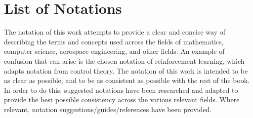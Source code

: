 \setlength{\glsdescwidth}{0.8\textwidth}

\chapter{List of Notations}

The notation of this work attempts to provide a clear and concise way of describing the terms and concepts used across the fields of mathematics, computer science, aerospace engineering, and other fields. An example of confusion that can arise is the chosen notation of reinforcement learning, which adapts notation from control theory. The notation of this work is intended to be as clear as possible, and to be as consistent as possible with the rest of the book. In order to do this, suggested notations have been researched and adapted to provide the best possible consistency across the various relevant fields. Where relevant, notation suggestions/guides/references have been provided.


\printnoidxglossary[
    type={notation:np},
    title={Numbers \& Arrays},
    nonumberlist
]

\printnoidxglossary[
    type={notation:ix},
    title={Indexing},
    nonumberlist
]

\printnoidxglossary[
    type={notation:orbit},
    title={Orbital Mechanics},
    nonumberlist
]
\printnoidxglossary[
    type={notation:mission},
    title={Other},
    nonumberlist
]
\printnoidxglossary[
    type={notation:set},
    title={Sets \& Graphs},
    nonumberlist
]
\printnoidxglossary[
    type={notation:fn},
    title={Functions},
    nonumberlist
]
\printnoidxglossary[
    type={notation:ml},
    title={Machine Learning},
    nonumberlist
]
\printnoidxglossary[
    type={notation:dl},
    title={Deep Learning},
    nonumberlist
]
\printnoidxglossary[
    type={notation:rl},
    title={Reinforcement Learning},
    nonumberlist
]
\printnoidxglossary[
    type={notation:prob},
    title={Probability and information theory},
]
